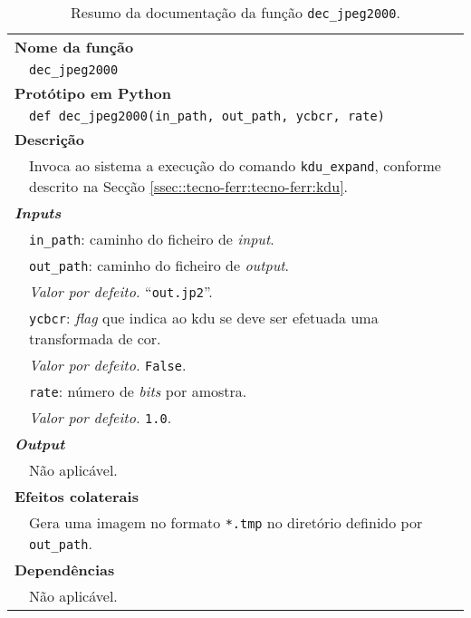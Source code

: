 \begin{table}[!htbp]
    \centering
    \caption{Resumo da documentação da função \texttt{dec\_jpeg2000}.}
    \label{tab:dec_jpeg2000}
    \begin{tabular}{p{1cm} p{10cm}}
        \hline
        \multicolumn{2}{l}{\bfseries Nome da função}\\
         & \verb|dec_jpeg2000|\\
        \hline
        \multicolumn{2}{l}{\bfseries Protótipo em Python}\\
         & \texttt{def dec_jpeg2000(in_path, out_path, ycbcr, rate)} \\
        \hline\multicolumn{2}{l}{\bfseries Descrição}\\
         & Invoca ao sistema a execução do comando \verb|kdu_expand|, conforme descrito na Secção \ref{ssec::tecno-ferr:tecno-ferr:kdu}. \\
        \hline\multicolumn{2}{l}{\bfseries \textit{Inputs}}\\
         & \verb|in_path|: caminho do ficheiro de \textit{input}. \\
         & \verb|out_path|: caminho do ficheiro de \textit{output}. \\
         & \hspace{1cm} \textit{Valor por defeito.} ``\verb|out.jp2|''.\\
         & \verb|ycbcr|: \textit{flag} que indica ao \ac{kdu} se deve ser efetuada uma transformada de cor. \\
         & \hspace{1cm} \textit{Valor por defeito.} \verb|False|.\\
         & \verb|rate|: número de \textit{bits} por amostra. \\
         & \hspace{1cm} \textit{Valor por defeito.} \verb|1.0|.\\
        \hline\multicolumn{2}{l}{\bfseries \textit{Output}}\\
         & Não aplicável. \\
        \hline\multicolumn{2}{l}{\bfseries Efeitos colaterais}\\
         & Gera uma imagem no formato \verb|*.tmp| no diretório definido por \verb|out_path|. \\
        \hline\multicolumn{2}{l}{\bfseries Dependências}\\
         & Não aplicável. \\
        \hline
    \end{tabular}
\end{table}

